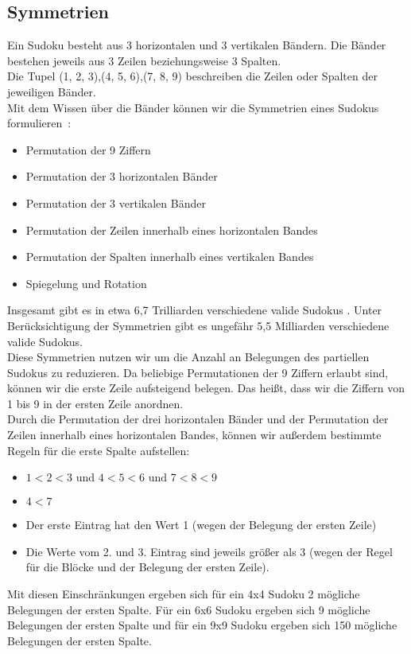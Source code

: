 \documentclass[12pt,a4paper]{article}
\begin{document}
\subsection{Symmetrien}
Ein Sudoku besteht aus 3 horizontalen und 3 vertikalen Bändern. Die Bänder bestehen jeweils aus 3 Zeilen beziehungsweise 3 Spalten. \\
Die Tupel (1, 2, 3),(4, 5, 6),(7, 8, 9) beschreiben die Zeilen oder Spalten der jeweiligen Bänder. \\
Mit dem Wissen über die Bänder können wir die Symmetrien eines Sudokus formulieren~\cite{russell2006mathematics}: \\
\begin{itemize}
    \item Permutation der 9 Ziffern
    \item Permutation der 3 horizontalen Bänder
    \item Permutation der 3 vertikalen Bänder
    \item Permutation der Zeilen innerhalb eines horizontalen Bandes
    \item Permutation der Spalten innerhalb eines vertikalen Bandes
    \item Spiegelung und Rotation
\end{itemize}
Insgesamt gibt es in etwa 6,7 Trilliarden verschiedene valide Sudokus \cite{felgenhauer2006mathematics}. Unter Berücksichtigung der Symmetrien
gibt es ungefähr 5,5 Milliarden verschiedene valide Sudokus\cite{russell2006mathematics}. \\
Diese Symmetrien nutzen wir um die Anzahl an Belegungen des partiellen Sudokus zu reduzieren. Da beliebige Permutationen der 9 Ziffern  erlaubt sind,
können wir die erste Zeile aufsteigend belegen. Das heißt, dass wir die Ziffern von 1 bis 9 in der ersten Zeile anordnen. \\
Durch die Permutation der drei horizontalen Bänder und der Permutation der Zeilen innerhalb eines horizontalen Bandes, können wir außerdem bestimmte Regeln für die erste Spalte aufstellen:
\begin{itemize}
    \item $1< 2< 3 \text{ und } 4<5<6 \text{ und } 7<8<9$
    \item $4 < 7$
    \item Der erste Eintrag hat den Wert 1 (wegen der Belegung der ersten Zeile)
    \item Die Werte vom 2. und 3. Eintrag sind jeweils größer als 3 (wegen der Regel für die Blöcke und der Belegung der ersten Zeile).
\end{itemize}
Mit diesen Einschränkungen ergeben sich für ein 4x4 Sudoku 2 mögliche Belegungen der ersten Spalte. Für ein 6x6 Sudoku ergeben sich 9 mögliche
Belegungen der ersten Spalte und für ein 9x9 Sudoku ergeben sich 150 mögliche Belegungen der ersten Spalte. \\
\end{document}
